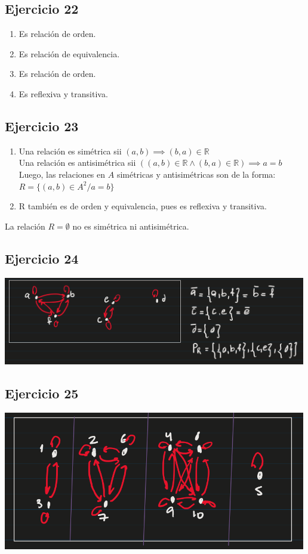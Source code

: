 \subsection{Ejercicio 22}
\begin{enumerate}[label=(\alph*)]
    \item Es relación de orden.
    \item Es relación de equivalencia.
    \item Es relación de orden.
    \item Es reflexiva y transitiva.
\end{enumerate}

\subsection{Ejercicio 23}
\begin{enumerate}[label=(\alph*)]
    \item Una relación es simétrica sii $(a,b) \implies (b,a) \in \mathbb{R}$ \\
        Una relación es antisimétrica sii $((a,b) \in \mathbb{R} \wedge (b,a) \in \mathbb{R}) \implies a = b$ \\
        Luego, las relaciones en $A$ simétricas y antisimétricas son de la forma: \\
        $R = \{ (a,b) \in A^2 / a = b \}$
    \item R también es de orden y equivalencia, pues es reflexiva y transitiva.
\end{enumerate}

La relación $R = \emptyset$ no es simétrica ni antisimétrica.

\subsection{Ejercicio 24}
\includegraphics[width=500px]{1.24}

\subsection{Ejercicio 25}
\includegraphics[width=500px]{1.25}

